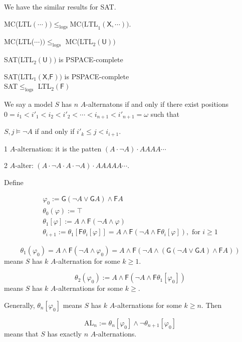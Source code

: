 \documentclass[12pt]{article}
\begin{document}
We have the similar results for SAT.

MC(LTL$(\cdots))\leq_{\text{logs}} \mbox{MC(LTL}_1(\textsf{X},\cdots))$. 

MC(LTL($\cdots))\leq_{\text{logs}}$ MC(LTL$_2(\textsf{U}))$ 

SAT(LTL$_2(\textsf{U}))$ is PSPACE-complete

SAT(LTL$_1(\textsf{X,F}))$ is PSPACE-complete \\ 



SAT$\leq_{\text{logs}}$ LTL$_2(\textsf{F})$


We say a model $S$ has $n$ $A$-alternatons if and only if 
there exist positions $0=i_1<i'_1<i_2<i'_2<\cdots<i_{n+1}<i'_{n+1}=\omega$ 
such that  

$S,j\models \neg A$ if and only if $i'_k\leq j<i_{i+1}$. 

1 $A$-alternation: it is the patten $(A\cdot\neg A)\cdot AAAA\cdots$

2 $A$-alter: $(A\cdot\neg A\cdot A\cdot\neg A)\cdot AAAAA\cdots$.  


Define 

$$\begin{array}{l}
\varphi_0:=\textsf{G}(\neg A\vee \textsf{G}A)\wedge \textsf{F}A\\

\theta_0(\varphi):=\top\\

\theta_1[\varphi]:=A\wedge \textsf{F}(\neg A\wedge \varphi)\\

\theta_{i+1}:=\theta_1[\textsf{F}\theta_i[\varphi]]=A
\wedge \textsf{F}(\neg A\wedge \textsf{F}\theta_i[\varphi]), \mbox{ for }i\geq 1

\end{array}
$$

$$\theta_1(\varphi_0)=A\wedge \textsf{F}(\neg A\wedge\varphi_0)=A\wedge\textsf{F}(\neg A\wedge (\textsf{G}(\neg A\vee \textsf{G}A)\wedge \textsf{F}A))$$ 
means $S$ has $k$ $A$-alternation for some $k\geq 1$.

$$\theta_2(\varphi_0):=A\wedge \textsf{F}(\neg A\wedge \textsf{F}\theta_1[\varphi_0])$$
means $S$ has $k$ $A$-alternations for some $k\geq$.

Generally, $\theta_n[\varphi_0]$ means $S$ has $k$ $A$-alternations for some $k\geq n$. Then 

$$\mbox{AL}_n:=\theta_n[\varphi_0]\wedge\neg\theta_{n+1}[\varphi_0]$$
means that $S$ has exactly $n$ $A$-alternations.  
\end{document}
